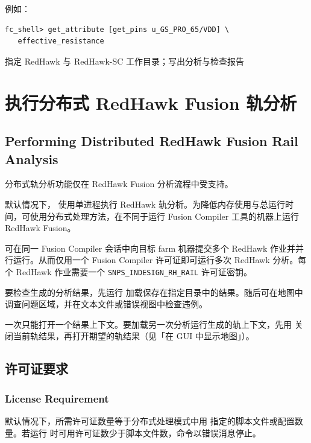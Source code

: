 例如：
\begin{lstlisting}
fc_shell> get_attribute [get_pins u_GS_PRO_65/VDD] \
   effective_resistance
\end{lstlisting}

\begin{seeAlsoBox}
指定 RedHawk 与 RedHawk-SC 工作目录；写出分析与检查报告
\end{seeAlsoBox}

\section{执行分布式 RedHawk Fusion 轨分析}
\subsection*{Performing Distributed RedHawk Fusion Rail Analysis}

\begin{noteBox}
分布式轨分析功能仅在 RedHawk Fusion 分析流程中受支持。
\end{noteBox}

默认情况下， 使用单进程执行 RedHawk 轨分析。为降低内存使用与总运行时间，可使用分布式处理方法，在不同于运行 Fusion Compiler 工具的机器上运行 RedHawk Fusion。

可在同一 Fusion Compiler 会话中向目标 farm 机器提交多个 RedHawk 作业并并行运行。从而仅用一个 Fusion Compiler 许可证即可运行多次 RedHawk 分析。每个 RedHawk 作业需要一个 \texttt{SNPS\_INDESIGN\_RH\_RAIL} 许可证密钥。

要检查生成的分析结果，先运行  加载保存在指定目录中的结果。随后可在地图中调查问题区域，并在文本文件或错误视图中检查违例。

一次只能打开一个结果上下文。要加载另一次分析运行生成的轨上下文，先用  关闭当前轨结果，再打开期望的轨结果（见「在 GUI 中显示地图」）。

\subsection{许可证要求}
\subsubsection*{License Requirement}

默认情况下，所需许可证数量等于分布式处理模式中用  指定的脚本文件或配置数量。若运行  时可用许可证数少于脚本文件数，命令以错误消息停止。

